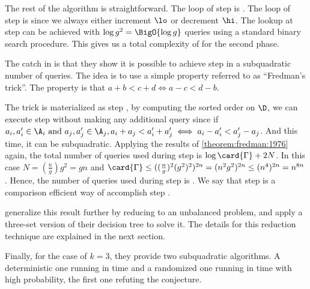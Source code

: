 The rest of the algorithm is straightforward. The loop of step  is
. The loop of step  is  since we
always either increment $\lo$ or decrement $\hi$. The lookup at step
 can be achieved with $\log g^2 = \BigO{\log g}$ queries using
a standard binary search procedure. This gives us a total complexity of
 for the second phase.

The catch in \citet*{gronlund:2014} is that they show it is possible to
achieve step  in a subquadratic number of queries. The idea is to use a simple property referred to as ``Fredman's
trick''. The property is that $a + b < c + d \iff a - c < d - b$.

The trick is materialized as step , by computing the sorted
order on $\D$, we can execute step  without making any additional
query since if $a_i, a_i' \in \A_i \text{ and } a_j, a_j' \in \A_j, a_i + a_j <
a_i' + a_j' \iff a_i - a_i' < a_j' - a_j$. And this time, it can be
subquadratic. Applying the results of \ref{theorem:fredman:1976} again, the
total number of queries used during step  is $\log \card{\Gamma} + 2N$.
In this case $N = (\frac{n}{g}) g^2 = gn$ and $\card{\Gamma} \le
((\frac{n}{g})^2 (g^2)^2)^{2n} = (n^2 g^2)^{2n} \le (n^4)^{2n} = n^{8n}$.
Hence, the number of queries used during step  is .
We say that step  is a comparison efficient way of accomplish step
.

\citet*{gronlund:2014} generalize this result further by reducing \kLDT to an
unbalanced \threeSUM problem, and apply a three-set version of their decision
tree to solve it. The details for this reduction technique are explained in
the next section.

Finally, for the case of $k = 3$, they provide two subquadratic \threeSUM
algorithms. A deterministic one running in  time and a randomized one running in  time with high probability, the first one refuting the \threeSUM
conjecture.
